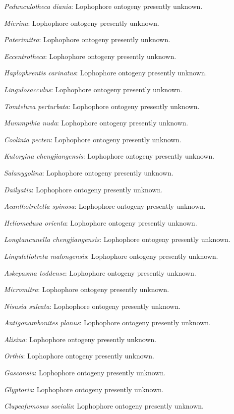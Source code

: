 \documentclass[openany]{book}
\theoremstyle{definition}
\theoremstyle{definition}
\theoremstyle{definition}
\theoremstyle{remark}
\begin{document}
\emph{Pedunculotheca diania}: Lophophore ontogeny presently unknown.

\emph{Micrina}: Lophophore ontogeny presently unknown.

\emph{Paterimitra}: Lophophore ontogeny presently unknown.

\emph{Eccentrotheca}: Lophophore ontogeny presently unknown.

\emph{Haplophrentis carinatus}: Lophophore ontogeny presently unknown.

\emph{Lingulosacculus}: Lophophore ontogeny presently unknown.

\emph{Tomteluva perturbata}: Lophophore ontogeny presently unknown.

\emph{Mummpikia nuda}: Lophophore ontogeny presently unknown.

\emph{Coolinia pecten}: Lophophore ontogeny presently unknown.

\emph{Kutorgina chengjiangensis}: Lophophore ontogeny presently unknown.

\emph{Salanygolina}: Lophophore ontogeny presently unknown.

\emph{Dailyatia}: Lophophore ontogeny presently unknown.

\emph{Acanthotretella spinosa}: Lophophore ontogeny presently unknown.

\emph{Heliomedusa orienta}: Lophophore ontogeny presently unknown.

\emph{Longtancunella chengjiangensis}: Lophophore ontogeny presently
unknown.

\emph{Lingulellotreta malongensis}: Lophophore ontogeny presently
unknown.

\emph{Askepasma toddense}: Lophophore ontogeny presently unknown.

\emph{Micromitra}: Lophophore ontogeny presently unknown.

\emph{Nisusia sulcata}: Lophophore ontogeny presently unknown.

\emph{Antigonambonites planus}: Lophophore ontogeny presently unknown.

\emph{Alisina}: Lophophore ontogeny presently unknown.

\emph{Orthis}: Lophophore ontogeny presently unknown.

\emph{Gasconsia}: Lophophore ontogeny presently unknown.

\emph{Glyptoria}: Lophophore ontogeny presently unknown.

\emph{Clupeafumosus socialis}: Lophophore ontogeny presently unknown.
\end{document}
